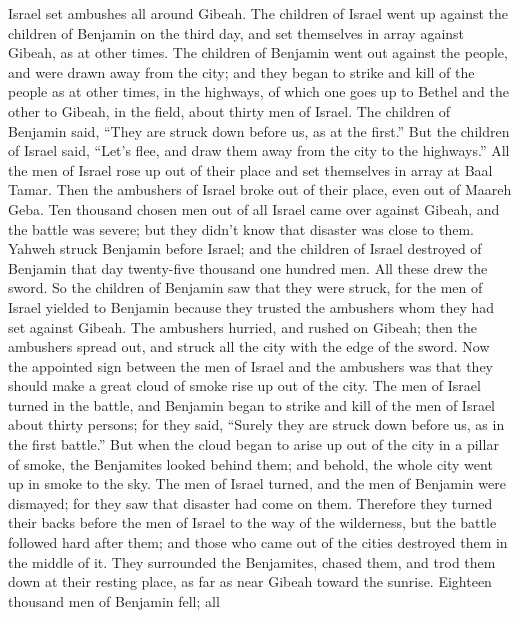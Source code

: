  Israel set ambushes all around Gibeah. 
The children of Israel went up against the children of Benjamin on the
third day, and set themselves in array against Gibeah, as at other
times.  The children of Benjamin went out against the
people, and were drawn away from the city; and they began to strike and
kill of the people as at other times, in the highways, of which one goes
up to Bethel and the other to Gibeah, in the field, about thirty men of
Israel.  The children of Benjamin said, ``They are struck
down before us, as at the first.'' But the children of Israel said,
``Let's flee, and draw them away from the city to the highways.''
 All the men of Israel rose up out of their place and set
themselves in array at Baal Tamar. Then the ambushers of Israel broke
out of their place, even out of Maareh Geba.  Ten
thousand chosen men out of all Israel came over against Gibeah, and the
battle was severe; but they didn't know that disaster was close to them.
 Yahweh struck Benjamin before Israel; and the children
of Israel destroyed of Benjamin that day twenty-five thousand one
hundred men. All these drew the sword.  So the children
of Benjamin saw that they were struck, for the men of Israel yielded to
Benjamin because they trusted the ambushers whom they had set against
Gibeah.  The ambushers hurried, and rushed on Gibeah;
then the ambushers spread out, and struck all the city with the edge of
the sword.  Now the appointed sign between the men of
Israel and the ambushers was that they should make a great cloud of
smoke rise up out of the city.  The men of Israel turned
in the battle, and Benjamin began to strike and kill of the men of
Israel about thirty persons; for they said, ``Surely they are struck
down before us, as in the first battle.''  But when the
cloud began to arise up out of the city in a pillar of smoke, the
Benjamites looked behind them; and behold, the whole city went up in
smoke to the sky.  The men of Israel turned, and the men
of Benjamin were dismayed; for they saw that disaster had come on them.
 Therefore they turned their backs before the men of
Israel to the way of the wilderness, but the battle followed hard after
them; and those who came out of the cities destroyed them in the middle
of it.  They surrounded the Benjamites, chased them, and
trod them down at their resting place, as far as near Gibeah toward the
sunrise.  Eighteen thousand men of Benjamin fell; all

